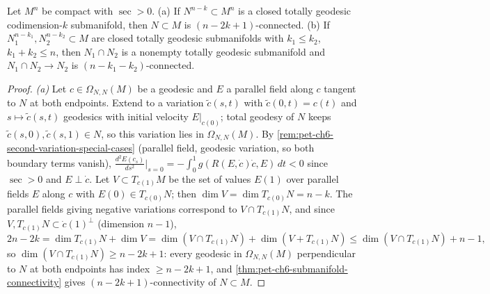 \begin{lemma}
  \label{lem:pet-ch6-wilking-connectedness-principle}
  Let $M^n$ be compact with $\sec>0$. (a) If $N^{n-k}\subset M^n$ is a closed
  totally geodesic codimension-$k$ submanifold, then $N\subset M$ is
  $(n-2k+1)$-connected. (b) If $N_1^{n-k_1},N_2^{n-k_2}\subset M$ are closed
  totally geodesic submanifolds with $k_1\le k_2$, $k_1+k_2\le n$, then
  $N_1\cap N_2$ is a nonempty totally geodesic submanifold and
  $N_1\cap N_2\to N_2$ is $(n-k_1-k_2)$-connected.
\end{lemma}
\begin{proof}
  \emph{(a)} Let $c\in\Omega_{N,N}(M)$ be a geodesic and $E$ a parallel field
  along $c$ tangent to $N$ at both endpoints. Extend to a variation
  $\tilde c(s,t)$ with $\tilde c(0,t)=c(t)$ and $s\mapsto\tilde c(s,t)$
  geodesics with initial velocity $E|_{c(0)}$; total geodesy of $N$ keeps
  $\tilde c(s,0),\tilde c(s,1)\in N$, so this variation lies in
  $\Omega_{N,N}(M)$. By \cref{rem:pet-ch6-second-variation-special-cases}
  (parallel field, geodesic variation, so both boundary terms vanish),
  $\frac{d^2E(c_s)}{ds^2}|_{s=0}=-\int_0^1g(R(E,\dot c)\dot c,E)\,dt<0$ since
  $\sec>0$ and $E\perp\dot c$. Let $V\subset T_{c(1)}M$ be the set of values
  $E(1)$ over parallel fields $E$ along $c$ with $E(0)\in T_{c(0)}N$; then
  $\dim V=\dim T_{c(0)}N=n-k$. The parallel fields giving negative variations
  correspond to $V\cap T_{c(1)}N$, and since $V,T_{c(1)}N\subset
  \dot c(1)^\perp$ (dimension $n-1$),
  \[
    2n-2k=\dim T_{c(1)}N+\dim V=\dim(V\cap T_{c(1)}N)+\dim(V+T_{c(1)}N)
    \le\dim(V\cap T_{c(1)}N)+n-1,
  \]
  so $\dim(V\cap T_{c(1)}N)\ge n-2k+1$: every geodesic in $\Omega_{N,N}(M)$
  perpendicular to $N$ at both endpoints has index $\ge n-2k+1$, and
  \cref{thm:pet-ch6-submanifold-connectivity} gives $(n-2k+1)$-connectivity
  of $N\subset M$.


\end{proof}
